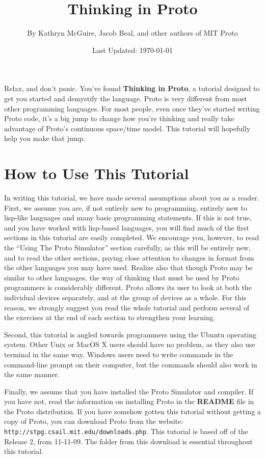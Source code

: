 \documentclass{article}
\title{Thinking in Proto}
\author{By Kathryn McGuire, Jacob Beal, and other authors of MIT Proto}
\date{Last Updated: \today}
\begin{document}
\maketitle

Relax, and don't panic.  You've found {\bf Thinking in Proto}, a
tutorial designed to get you started and demystify the language.
Proto is very different from most other programming languages.  For
most people, even once they've started writing Proto code, it's a big
jump to change how you're thinking and really take advantage of
Proto's continuous space/time model.  This tutorial will hopefully
help you make that jump.

\tableofcontents




\section{How to Use This Tutorial}
	
In writing this tutorial, we have made several assumptions about you
as a reader.  First, we assume you are, if not entirely new to
programming, entirely new to lisp-like languages and many basic
programming statements.  If this is not true, and you have worked with
lisp-based languages, you will find much of the first sections in this
tutorial are easily completed.  We encourage you, however, to read the
``Using The Proto Simulator'' section carefully, as this will be
entirely new, and to read the other sections, paying close attention
to changes in format from the other languages you may have used.
Realize also that though Proto may be similar to other languages, the
way of thinking that must be used by Proto programmers is considerably
different.  Proto allows its user to look at both the individual
devices separately, and at the group of devices as a whole.  For this
reason, we strongly suggest you read the whole tutorial and perform
several of the exercises at the end of each section to strengthen your
learning.

Second, this tutorial is angled towards programmers using the Ubuntu
operating system.  Other Unix or MacOS X users should have no problem,
as they also use terminal in the same way.  Windows users need to
write commands in the command-line prompt on their computer, but the
commands should also work in the same manner.

Finally, we assume that you have installed the Proto Simulator and
compiler.  If you have not, read the information on installing Proto
in the {\bf README} file in the Proto distribution.  If you have
somehow gotten this tutorial without getting a copy of Proto, you can
download Proto from the website: {\tt
  http://stpg.csail.mit.edu/downloads.php}.  This tutorial is based
off of the Release 2, from 11-11-09.  The folder from this download is
essential throughout this tutorial.
\end{document}
